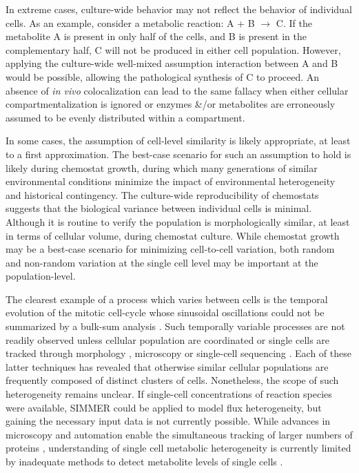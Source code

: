 In extreme cases, culture-wide behavior may not reflect the behavior of individual cells. As an example, consider a metabolic reaction: A + B $\rightarrow$ C. If the metabolite A is present in only half of the cells, and B is present in the complementary half, C will not be produced in either cell population. However, applying the culture-wide well-mixed assumption interaction between A and B would be possible, allowing the pathological synthesis of C to proceed. An absence of \textit{in vivo} colocalization can lead to the same fallacy when either cellular compartmentalization is ignored or enzymes \&/or metabolites are erroneously assumed to be evenly distributed within a compartment.

In some cases, the assumption of cell-level similarity is likely appropriate, at least to a first approximation. The best-case scenario for such an assumption to hold is likely during chemostat growth, during which many generations of similar environmental conditions minimize the impact of environmental heterogeneity and historical contingency. The culture-wide reproducibility of chemostats suggests that the biological variance between individual cells is minimal. Although it is routine to verify the population is morphologically similar, at least in terms of cellular volume, during chemostat culture. While chemostat growth may be a best-case scenario for minimizing cell-to-cell variation, both random \cite{BarEven:2006dz, Kaern:2005gr} and non-random variation at the single cell level may be important at the population-level.

The clearest example of a process which varies between cells is the temporal evolution of the mitotic cell-cycle whose sinusoidal oscillations could not be summarized by a bulk-sum analysis \cite{Hartwell:1974uy, Spellman:1998wj}. Such temporally variable processes are not readily observed unless cellular population are coordinated\cite{Hartwell:1974uy, Tu:2006cl} or single cells are tracked through morphology \cite{Herskowitz:1988ut}, microscopy \cite{Venturelli:2015ec} or single-cell sequencing \cite{Patel:2014dt}. Each of these latter techniques has revealed that otherwise similar cellular populations are frequently composed of distinct clusters of cells. Nonetheless, the scope of such heterogeneity remains unclear. If single-cell concentrations of reaction species were available, SIMMER could be applied to model flux heterogeneity, but gaining the necessary input data is not currently possible. While advances in microscopy and automation enable the simultaneous tracking of larger numbers of proteins \cite{Ghaemmaghami:2003ds, Dubuis:2013cw}, understanding of single cell metabolic heterogeneity is currently limited by inadequate methods to detect metabolite levels of single cells \cite{Zenobi:2013il}.

